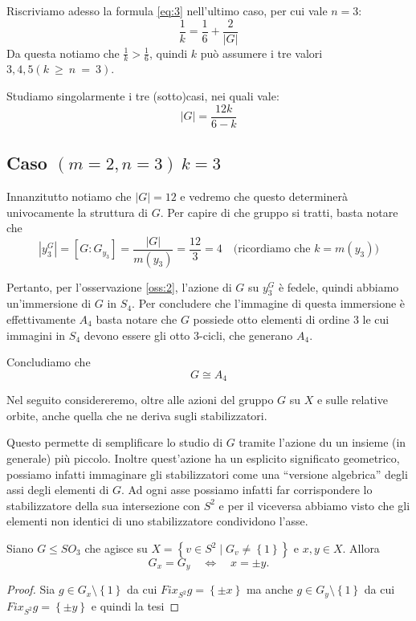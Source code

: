 Riscriviamo adesso la formula \ref{eq:3} nell'ultimo caso, per cui vale $n=3$:
\begin{equation} \label{eq:4}
\frac{1}{k} = \frac{1}{6} + \frac{2}{\left|G\right|}
\end{equation}
Da questa notiamo che $\frac{1}{k}>\frac{1}{6}$, quindi $k$ pu\`o assumere i tre valori $3,4,5 (k~\geq~n~=~3)$.

Studiamo singolarmente i tre (sotto)casi, nei quali vale:
\begin{equation} \label{eq:5}
\left|G\right| = \frac{12k}{6-k}
\end{equation}
\subsection{Caso $(m=2,n=3)\ k=3$}
Innanzitutto notiamo che $\left|G\right|=12$ e vedremo che questo determiner\`a univocamente la struttura di $G$.
Per capire di che gruppo si tratti, basta notare che
\begin{equation*}
\left|y_3^G\right| = \left[G:G_{y_3}\right]=\frac{\left|G\right|}{m(y_3)}=\frac{12}{3}=4\quad\text{(ricordiamo che }k=m(y_3)\text{)}
\end{equation*}

Pertanto, per l'osservazione \ref{oss:2}, l'azione di $G$ su $y_3^G$ \`e fedele, quindi abbiamo un'immersione di $G$ in $S_4$.
Per concludere che l'immagine di questa immersione \`e effettivamente $A_4$ basta notare che $G$ possiede otto elementi di ordine $3$
le cui immagini in $S_4$ devono essere gli otto $3$-cicli, che generano $A_4$.

Concludiamo che 
\begin{equation*}
G\cong A_4
\end{equation*}

Nel seguito considereremo, oltre alle azioni del gruppo $G$ su $X$ e sulle relative orbite, anche quella che ne deriva
sugli stabilizzatori.

Questo permette di semplificare lo studio di $G$ tramite l'azione du un insieme (in generale) pi\`u piccolo.
Inoltre quest'azione ha un esplicito significato geometrico, possiamo infatti immaginare gli stabilizzatori come una
``versione algebrica'' degli assi degli elementi di $G$.
Ad ogni asse possiamo infatti far corrispondere lo stabilizzatore della sua intersezione con $S^2$ e per il viceversa
abbiamo visto che gli elementi non identici di uno stabilizzatore condividono l'asse.

\begin{oss} \label{oss:3}
Siano $G\leq SO_3$ che agisce su $X=\left\{v\in S^2\mid G_v\neq\left\{1\right\}\right\}$ e $x, y\in X$. Allora
\begin{equation*}
G_x = G_y\quad \Longleftrightarrow\quad x=\pm y.
\end{equation*}
\begin{proof}
Sia $g\in G_x\setminus\left\{1\right\}$ da cui $Fix_{S^2}g = \left\{\pm x\right\}$ ma anche
$g\in G_y\setminus\left\{1\right\}$ da cui $Fix_{S^2}g = \left\{\pm y\right\}$ e quindi la tesi
\end{proof}
\end{oss}

